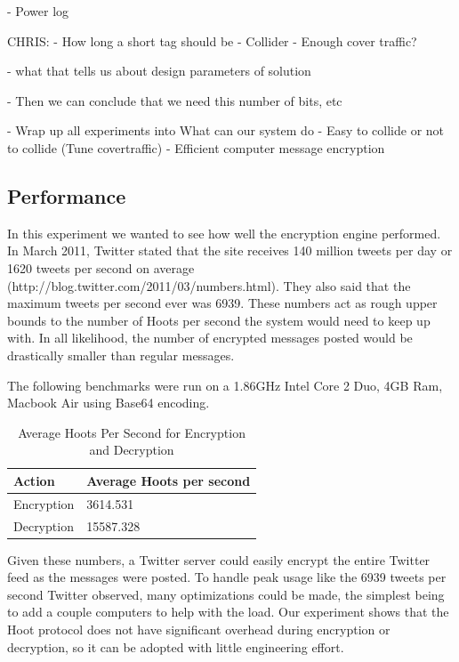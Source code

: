 \documentclass{acm_proc_article-sp}
\begin{document}
- Power log

CHRIS:
- How long a short tag should be
- Collider
- Enough cover traffic?

- what that tells us about design parameters of solution

- Then we can conclude that we need this number of bits, etc

- Wrap up all experiments into What can our system do
	- Easy to collide or not to collide (Tune covertraffic)
	- Efficient computer message encryption

\subsection{Performance}

In this experiment we wanted to see how well the encryption engine performed. In March 2011, Twitter stated that the site receives 140 million tweets per day or 1620 tweets per second on average (http://blog.twitter.com/2011/03/numbers.html). They also said that the maximum tweets per second ever was 6939. These numbers act as rough upper bounds to the number of Hoots per second the system would need to keep up with. In all likelihood, the number of encrypted messages posted would be drastically smaller than regular messages.

The following benchmarks were run on a 1.86GHz Intel Core 2 Duo, 4GB Ram, Macbook Air using Base64 encoding. 


\begin{table}
\caption{Average Hoots Per Second for Encryption and Decryption}
\begin{center}
    \begin{tabular}{ l  l }
	\hline
	Action & Average Hoots per second \\ \hline
	Encryption & 3614.531 \\
	Decryption & 15587.328 \\ \hline
    \end{tabular}
\end{center}
\end{table}

Given these numbers, a Twitter server could easily encrypt the entire Twitter feed as the messages were posted. To handle peak usage like the 6939 tweets per second Twitter observed, many optimizations could be made, the simplest being to add a couple computers to help with the load. Our experiment shows that the Hoot protocol does not have significant overhead during encryption or decryption, so it can be adopted with little engineering effort.
\end{document}
